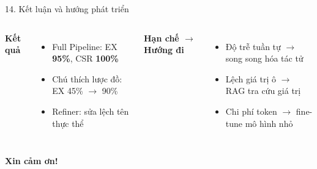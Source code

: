 \documentclass[aspectratio=169,10pt]{beamer}
\begin{document}
\begin{frame}{14. Kết luận và hướng phát triển}
\begin{columns}[T]
\textbf{Kết quả}
\begin{itemize}
  \item Full Pipeline: EX \textbf{95\%}, CSR \textbf{100\%}
  \item Chú thích lược đồ: EX 45\% $\to$ 90\%
  \item Refiner: sửa lệch tên thực thể
\end{itemize}
\textbf{Hạn chế $\to$ Hướng đi}
\begin{itemize}
  \item Độ trễ tuần tự $\to$ song song hóa tác tử
  \item Lệch giá trị ô $\to$ \alert{RAG} tra cứu giá trị
  \item Chi phí token $\to$ fine-tune mô hình nhỏ
\end{itemize}
\end{columns}
\vfill
\centering\Large\textbf{Xin cảm ơn!}
\end{frame}
\end{document}
